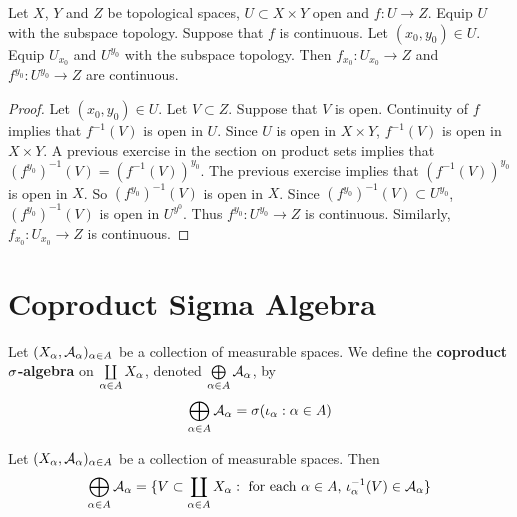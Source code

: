 \documentclass{book}
\begin{document}
	\begin{ex}
		Let $X$, $Y$ and $Z$ be topological spaces, $U \subset X \times Y$ open and $f: U \rightarrow Z$. Equip $U$ with the subspace topology. Suppose that $f$ is continuous. Let $(x_0, y_0) \in U$. Equip $U_{x_0}$ and $U^{y_0}$ with the subspace topology. Then $f_{x_0}:U_{x_0} \rightarrow Z$ and $f^{y_0}: U^{y_0} \rightarrow Z$ are continuous.
	\end{ex}
	
	\begin{proof}
		Let $(x_0, y_0) \in U$. Let $V \subset Z$. Suppose that $V$ is open. Continuity of $f$ implies that $f^{-1}(V)$ is open in $U$. Since $U$ is open in $X \times Y$, $f^{-1}(V)$ is open in $X \times Y$. A previous exercise in the section on product sets implies that $(f^{y_0})^{-1}(V) = (f^{-1}(V))^{y_0}$. The previous exercise implies that $(f^{-1}(V))^{y_0}$ is open in $X$. So $(f^{y_0})^{-1}(V)$ is open in $X$. Since $(f^{y_0})^{-1}(V) \subset U^{y_0}$, $(f^{y_0})^{-1}(V)$ is open in $U^{y^0}$. Thus $f^{y_0}: U^{y_0} \rightarrow Z$ is continuous. Similarly, $f_{x_0}: U_{x_0} \rightarrow Z$ is continuous.
	\end{proof}


	
	
	
	
	
	
	
	
	
	
	
	
	
	
	
	
	
	
	
	
	\newpage
	\section{Coproduct Sigma Algebra}
	
	\begin{defn}
		Let $(X_{\alpha}, \mathcal{A}_{\alpha})_{\alpha \in A}$ be a collection of measurable spaces. We define the \textbf{coproduct $\sigma$-algebra} on $\coprod\limits_{\alpha \in A}X_{\alpha}$, denoted $\bigoplus\limits_{\alpha \in A} \mathcal{A}_{\alpha}$, by 
		$$\bigoplus\limits_{\alpha \in A} \mathcal{A}_{\alpha} = \sigma (\iota_{\alpha}: \alpha \in A)$$
	\end{defn}

	\begin{ex}
		Let $(X_{\alpha}, \mathcal{A}_{\alpha})_{\alpha \in A}$ be a collection of measurable spaces. Then $$\bigoplus\limits_{\alpha \in A} \mathcal{A}_{\alpha} = \{V \subset \coprod_{\alpha \in A}  X_{\alpha}: \text{ for each $\alpha \in A$, $\iota_{\alpha}^{-1}(V) \in \mathcal{A}_{\alpha}$}\}$$
	\end{ex}
\end{document}
